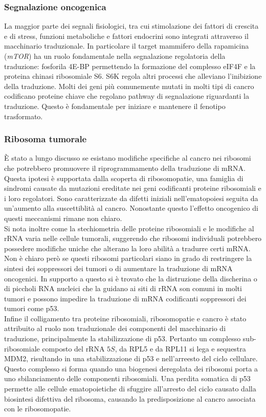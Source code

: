 		\subsubsection{Segnalazione oncogenica}
		La maggior parte dei segnali fisiologici, tra cui stimolazione dei fattori di crescita e di stress, funzioni metaboliche e fattori endocrini sono integrati attraverso il macchinario traduzionale.
		In particolare il target mammifero della rapamicina (\emph{mTOR}) ha un ruolo fondamentale nella segnalazione regolatoria della traduzione: fosforila 4E-BP permettendo la formazione del complesso eIF4F e la proteina chinasi ribosomiale S6.
		S6K regola altri processi che alleviano l'inibizione della traduzione.
		Molti dei geni pi\`u comunemente mutati in molti tipi di cancro codificano proteine chiave che regolano pathway di segnalazione riguardanti la traduzione.
		Questo \`e fondamentale per iniziare e mantenere il fenotipo trasformato.

		\subsubsection{Ribosoma tumorale}
		\`E stato a lungo discusso se esistano modifiche specifiche al cancro nei ribosomi che potrebbero promuovere il riprogrammamento della traduzione di mRNA.
		Questa ipotesi \`e supportata dalla scoperta di ribosomopatie, una famiglia di sindromi causate da mutazioni ereditate nei geni codificanti proteine ribosomiali e i loro regolatori.
		Sono caratterizzate da difetti iniziali nell'ematopoiesi seguita da un'aumento alla suscettiblit\`a al cancro.
		Nonostante questo l'effetto oncogenico di questi meccanismi rimane non chiaro.\\
		Si nota inoltre come la stechiometria delle proteine ribosomiali e le modifiche al rRNA varia nelle cellule tumorali, suggerendo che ribosomi individuali potrebbero possedere modifiche uniche che alterano la loro abilit\`a a tradurre certi mRNA.
		Non \`e chiaro per\`o se questi ribosomi particolari siano in grado di restringere la sintesi dei soppressori dei tumori o di aumentare la traduzione di mRNA oncogenici.
		In supporto a questo si \`e trovato che la distruzione della discherina o di piccholi RNA nucleici che la guidano ai siti di rRNA son comuni in molti tumori e possono impedire la traduzione di mRNA codificanti soppressori dei tumori come p53.\\
		Infine il colligamento tra proteine ribosomiali, ribosomopatie e cancro \`e stato attribuito al ruolo non traduzionale dei componenti del macchinario di traduzione, principalmente la stabilizzazione di p53.
		Pertanto un complesso sub-ribosomiale composto del rRNA $5S$, da RPL5 e da RPL11 si lega e sequestra MDM2, risultando in una stabilizzazione di p53 e nell'arreesto del ciclo cellulare.
		Questo complesso si forma quando una biogenesi deregolata dei ribosomi porta a uno sbilanciamento delle componenti ribosomiali.
		Una perdita somatica di p53 permette alle cellule ematopoietiche di sfuggire all'arresto del ciclo causato dalla biosintesi difettiva del ribosoma, causando la predisposizione al cancro associata con le ribosomopatie.

